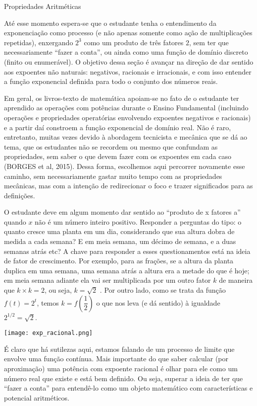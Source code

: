\begin{paginatexto}{Propriedades Aritméticas}

Até esse momento espera-se que o estudante tenha o entendimento da exponenciação como processo (e não apenas somente como ação de multiplicações repetidas), enxergando $2^{3}$ como um produto de três fatores $2$, sem ter que necessariamente ``fazer a conta'', ou ainda como uma função de domínio discreto (finito ou enumerável). O objetivo dessa seção é avançar na direção de dar sentido aos expoentes não naturais: negativos, racionais e irracionais, e com isso entender a função exponencial definida para todo o conjunto dos números reais. 

Em geral, os livros-texto de matemática apoiam-se no fato de o estudante ter aprendido as operações com potências durante o Ensino Fundamental (incluindo operações e propriedades operatórias envolvendo expoentes negativos e racionais) e a partir daí constroem a função exponencial de domínio real. Não é raro, entretanto, muitas vezes devido à abordagem tecnicista e mecânica que se dá ao tema, que os estudantes não se recordem ou mesmo que confundam as propriedades, sem saber o que devem fazer com os expoentes em cada caso (BORGES et al, 2015). Dessa forma, escolhemos aqui percorrer novamente esse caminho, sem necessariamente gastar muito tempo com as propriedades mecânicas, mas com a intenção de redirecionar o foco e trazer significados para as definições. 

O estudante deve em algum momento dar sentido ao ``produto de x fatores a'' quando $x$ não é um número inteiro positivo. Responder a perguntas do tipo: o quanto cresce uma planta em um dia, considerando que sua altura dobra de medida a cada semana? E em meia semana, um décimo de semana, e a duas semanas atrás etc? A chave para responder a esses questionamentos está na ideia de fator de crescimento. Por exemplo, para as frações, se a altura da planta duplica em uma semana, uma semana atrás a altura era a metade do que é hoje; em meia semana adiante ela vai ser multiplicada por um outro fator $k$ de maneira que $k \times k=2$, ou seja, $k= \sqrt{2}$ . Por outro lado, como se trata da função $f(t)=2^{t}$, temos $k=f\left( \dfrac{1}{2} \right)$ o que nos leva (e dá sentido) à igualdade $2^{1/2}=\sqrt{2}$.

\resizebox{\linewidth}{!}
{
\texttt{[image: exp\_racional.png]}
}

É claro que há sutilezas aqui, estamos falando de um processo de limite que envolve uma função contínua. Mais importante do que saber calcular (por aproximação) uma potência com expoente racional é olhar para ele como um número real que existe e está bem definido. Ou seja, superar a ideia de ter que ``fazer a conta'' para entendê-lo como um objeto matemático com características e potencial aritméticos.


\end{paginatexto}
